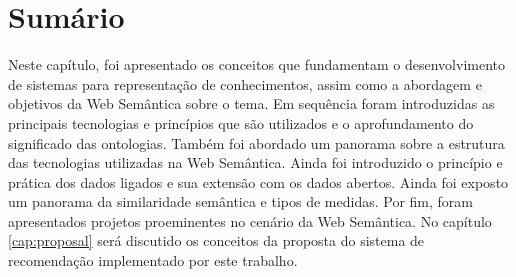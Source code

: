 \section{Sumário}

Neste capítulo, foi apresentado os conceitos que fundamentam o desenvolvimento de sistemas para representação de conhecimentos, assim como a abordagem e objetivos da Web Semântica sobre o tema. Em sequência foram introduzidas as principais tecnologias e princípios que são utilizados e o aprofundamento do significado das ontologias. Também foi abordado um panorama sobre a estrutura das tecnologias utilizadas na Web Semântica. Ainda foi introduzido o princípio e prática dos dados ligados e sua extensão com os dados abertos. Ainda foi exposto um panorama da similaridade semântica e tipos de medidas. Por fim, foram apresentados projetos proeminentes no cenário da Web Semântica. No capítulo \ref{cap:proposal} será discutido os conceitos da proposta do sistema de recomendação implementado por este trabalho.

\label{cap:semantic_web}
